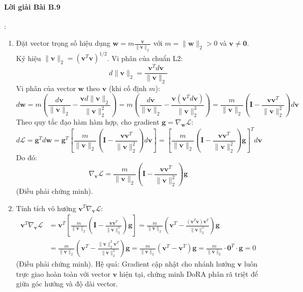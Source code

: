 \paragraph{Lời giải Bài B.9}:
\begin{enumerate}
  \item Đặt vector trọng số hiệu dụng $\mathbf{w} = m \frac{\mathbf{v}}{\|\mathbf{v}\|_2}$ với $m = \|\mathbf{w}\|_2 > 0$ và $\mathbf{v} \neq \mathbf{0}$.
  Ký hiệu $\|\mathbf{v}\|_2 = (\mathbf{v}^T \mathbf{v})^{1/2}$. Vi phân của chuẩn L2:
  \begin{equation*}
  d\|\mathbf{v}\|_2 = \frac{\mathbf{v}^T d\mathbf{v}}{\|\mathbf{v}\|_2}
  \end{equation*}
  Vi phân của vector $\mathbf{w}$ theo $\mathbf{v}$ (khi cố định $m$):
  \begin{equation*}
  d\mathbf{w} = m \left( \frac{d\mathbf{v}}{\|\mathbf{v}\|_2} - \frac{\mathbf{v} d\|\mathbf{v}\|_2}{\|\mathbf{v}\|_2^2} \right) = m \left( \frac{d\mathbf{v}}{\|\mathbf{v}\|_2} - \frac{\mathbf{v} (\mathbf{v}^T d\mathbf{v})}{\|\mathbf{v}\|_2^3} \right) = \frac{m}{\|\mathbf{v}\|_2} \left( \mathbf{I} - \frac{\mathbf{v}\mathbf{v}^T}{\|\mathbf{v}\|_2^2} \right) d\mathbf{v}
  \end{equation*}
  Theo quy tắc đạo hàm hàm hợp, cho gradient $\mathbf{g} = \nabla_{\mathbf{w}} \mathcal{L}$:
  \begin{equation*}
  d\mathcal{L} = \mathbf{g}^T d\mathbf{w} = \mathbf{g}^T \left[ \frac{m}{\|\mathbf{v}\|_2} \left( \mathbf{I} - \frac{\mathbf{v}\mathbf{v}^T}{\|\mathbf{v}\|_2^2} \right) d\mathbf{v} \right] = \left[ \frac{m}{\|\mathbf{v}\|_2} \left( \mathbf{I} - \frac{\mathbf{v}\mathbf{v}^T}{\|\mathbf{v}\|_2^2} \right) \mathbf{g} \right]^T d\mathbf{v}
  \end{equation*}
  Do đó:
  \begin{equation*}
  \nabla_{\mathbf{v}} \mathcal{L} = \frac{m}{\|\mathbf{v}\|_2} \left( \mathbf{I} - \frac{\mathbf{v}\mathbf{v}^T}{\|\mathbf{v}\|_2^2} \right) \mathbf{g}
  \end{equation*}
  (Điều phải chứng minh).

  \item Tính tích vô hướng $\mathbf{v}^T \nabla_{\mathbf{v}} \mathcal{L}$:
  \begin{align*}
  \mathbf{v}^T \nabla_{\mathbf{v}} \mathcal{L} &= \mathbf{v}^T \left[ \frac{m}{\|\mathbf{v}\|_2} \left( \mathbf{I} - \frac{\mathbf{v}\mathbf{v}^T}{\|\mathbf{v}\|_2^2} \right) \mathbf{g} \right] = \frac{m}{\|\mathbf{v}\|_2} \left( \mathbf{v}^T - \frac{(\mathbf{v}^T \mathbf{v}) \mathbf{v}^T}{\|\mathbf{v}\|_2^2} \right) \mathbf{g} \\
  &= \frac{m}{\|\mathbf{v}\|_2} \left( \mathbf{v}^T - \frac{\|\mathbf{v}\|_2^2 \mathbf{v}^T}{\|\mathbf{v}\|_2^2} \right) \mathbf{g} = \frac{m}{\|\mathbf{v}\|_2} \left( \mathbf{v}^T - \mathbf{v}^T \right) \mathbf{g} = \frac{m}{\|\mathbf{v}\|_2} \cdot \mathbf{0}^T \cdot \mathbf{g} = 0
  \end{align*}
  (Điều phải chứng minh).
  Hệ quả: Gradient cập nhật cho nhánh hướng $\mathbf{v}$ luôn trực giao hoàn toàn với vector $\mathbf{v}$ hiện tại, chứng minh DoRA phân rã triệt để giữa góc hướng và độ dài vector.
\end{enumerate}

